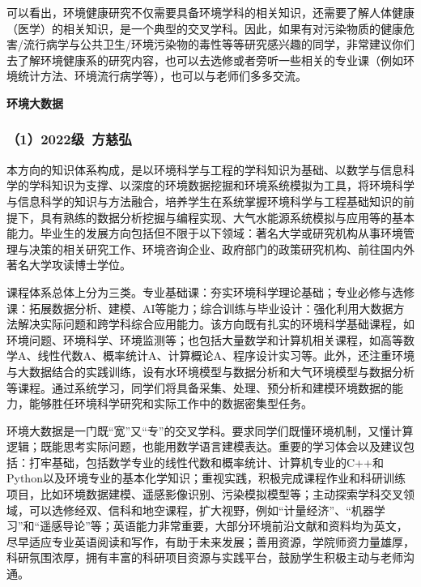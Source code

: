 \documentclass[11pt,oneside]{book}
\begin{document}
\vspace{10pt}

可以看出，环境健康研究不仅需要具备环境学科的相关知识，还需要了解人体健康（医学）的相关知识，是一个典型的交叉学科。因此，如果有对污染物质的健康危害/流行病学与公共卫生/环境污染物的毒性等等研究感兴趣的同学，非常建议你们去了解环境健康系的研究内容，也可以去选修或者旁听一些相关的专业课（例如环境统计方法、环境流行病学等），也可以与老师们多多交流。

\vspace{10pt}

\textbf{环境大数据}

\subsubsection{（1）2022级\ 方慈弘}

本方向的知识体系构成，是以环境科学与工程的学科知识为基础、以数学与信息科学的学科知识为支撑、以深度的环境数据挖掘和环境系统模拟为工具，将环境科学与信息科学的知识与方法融合，培养学生在系统掌握环境科学与工程基础知识的前提下，具有熟练的数据分析挖掘与编程实现、大气水能源系统模拟与应用等的基本能力。毕业生的发展方向包括但不限于以下领域：著名大学或研究机构从事环境管理与决策的相关研究工作、环境咨询企业、政府部门的政策研究机构、前往国内外著名大学攻读博士学位。

\vspace{10pt}

课程体系总体上分为三类。专业基础课：夯实环境科学理论基础；专业必修与选修课：拓展数据分析、建模、AI等能力；综合训练与毕业设计：强化利用大数据方法解决实际问题和跨学科综合应用能力。该方向既有扎实的环境科学基础课程，如环境问题、环境科学、环境监测等；也包括大量数学和计算机相关课程，如高等数学A、线性代数A、概率统计A、计算概论A、程序设计实习等。此外，还注重环境与大数据结合的实践训练，设有水环境模型与数据分析和大气环境模型与数据分析等课程。通过系统学习，同学们将具备采集、处理、预分析和建模环境数据的能力，能够胜任环境科学研究和实际工作中的数据密集型任务。

\vspace{10pt}

环境大数据是一门既“宽”又“专”的交叉学科。要求同学们既懂环境机制，又懂计算逻辑；既能思考实际问题，也能用数学语言建模表达。重要的学习体会以及建议包括：打牢基础，包括数学专业的线性代数和概率统计、计算机专业的C++和Python以及环境专业的基本化学知识；重视实践，积极完成课程作业和科研训练项目，比如环境数据建模、遥感影像识别、污染模拟模型等；主动探索学科交叉领域，可以选修经双、信科和地空课程，扩大视野，例如“计量经济”、“机器学习”和“遥感导论”等；英语能力非常重要，大部分环境前沿文献和资料均为英文，尽早适应专业英语阅读和写作，有助于未来发展；善用资源，学院师资力量雄厚，科研氛围浓厚，拥有丰富的科研项目资源与实践平台，鼓励学生积极主动与老师沟通。
\end{document}
